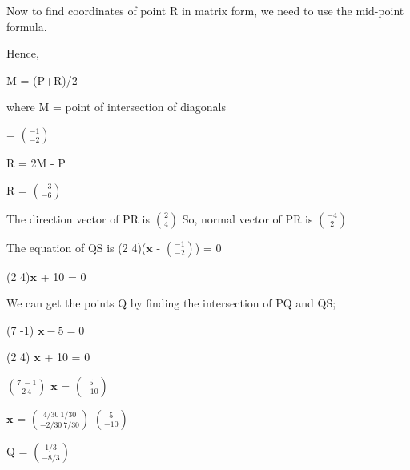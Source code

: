 \documentclass{beamer}
\begin{document}
\begin{frame}
Now to find coordinates of point R in matrix form, we need to use the mid-point formula.

Hence,

\setlength{\parindent}{3.6cm}
 M = (P+R)/2
\vspace{2 mm}

\setlength{\parindent}{2cm}
 where M = point of intersection of diagonals
\vspace{2 mm}

\setlength{\parindent}{3.4cm}
 = $\binom{-1}{-2}$

\setlength{\parindent}{3.4cm}
\vspace{2 mm}
R = 2M - P


\vspace{2 mm}
R = $\binom{-3}{-6}$


\vspace{2 mm}

\setlength{\parindent}{0cm}
The direction vector of PR is $\binom{2}{4}$
\vspace{2 mm}
So, normal vector of PR is $\binom{-4}{2}$

\vspace{2 mm}
The equation of QS is (2  4)($\boldsymbol{x}$  -  $\binom{-1}{-2}$) = 0

\vspace{2 mm}
\setlength{\parindent}{4cm}
(2  4)$\boldsymbol{x}$  +  10 = 0

\end{frame}

\begin{frame}
We can get the points Q by finding the intersection of PQ and QS;

\vspace{2 mm}
\setlength{\parindent}{4cm}
(7  -1) $\boldsymbol{x}-5=0$
\vspace{2 mm}

(2   4) $\boldsymbol{x}$  +  10 = 0

\vspace{2 mm}
$\binom{7 \ -1}{2  \   4}$ $\boldsymbol{x}$ = $\binom{5}{-10}$

\vspace{2 mm}
$\boldsymbol{x}$ = $\binom{4/30 \ 1/30}{-2/30  \  7/30}$ $\binom{5}{-10}$


\vspace{2 mm}
Q = $\binom{1/3}{-8/3}$
\end{frame}
 
\end{document}
